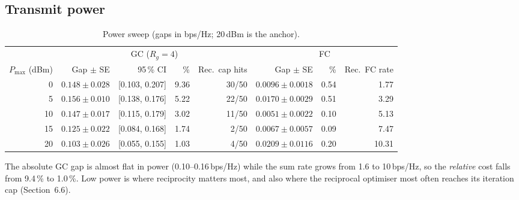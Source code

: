 \documentclass[10pt,a4paper]{article}
\newcommand{\bpsHz}{bps/Hz}
\begin{document}
\subsection{Transmit power}
\begin{table}[H]\centering\small
\begin{tabular}{@{}rrrrrrrr@{}}\toprule
 & \multicolumn{4}{c}{GC ($R_g{=}4$)} & \multicolumn{3}{c}{FC}\\\cmidrule(lr){2-5}\cmidrule(lr){6-8}
$P_{\max}$ (dBm) & Gap $\pm$ SE & 95\,\% CI & \% & Rec.\ cap hits & Gap $\pm$ SE & \% & Rec.\ FC rate\\\midrule
0  & $0.148\pm0.028$ & [0.103, 0.207] & 9.36 & 30/50 & $0.0096\pm0.0018$ & 0.54 & 1.77\\
5  & $0.156\pm0.010$ & [0.138, 0.176] & 5.22 & 22/50 & $0.0170\pm0.0029$ & 0.51 & 3.29\\
10 & $0.147\pm0.017$ & [0.115, 0.179] & 3.02 & 11/50 & $0.0051\pm0.0022$ & 0.10 & 5.13\\
15 & $0.125\pm0.022$ & [0.084, 0.168] & 1.74 & 2/50  & $0.0067\pm0.0057$ & 0.09 & 7.47\\
20 & $0.103\pm0.026$ & [0.055, 0.155] & 1.03 & 4/50  & $0.0209\pm0.0116$ & 0.20 & 10.31\\\bottomrule
\end{tabular}
\caption{Power sweep (gaps in \bpsHz; 20\,dBm is the anchor).}
\end{table}
The absolute GC gap is almost flat in power (0.10--0.16\,\bpsHz) while the sum rate grows from 1.6 to 10\,\bpsHz, so the \emph{relative} cost falls from 9.4\,\% to 1.0\,\%. Low power is where reciprocity matters most, and also where the reciprocal optimiser most often reaches its iteration cap (Section~6.6).
\end{document}

